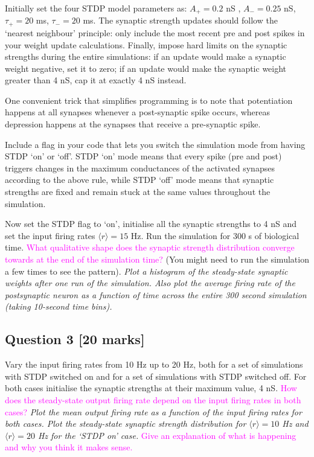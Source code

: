 \documentclass[12pt]{article}
\begin{document}
Initially set the four STDP model parameters as: $A_{+}=0.2$ nS ,
$A_{-}=0.25$ nS, $\tau_{+}=20$ ms, $\tau_{-}=20$ ms. The synaptic
strength updates should follow the `nearest neighbour' principle:
only include the most recent pre and post spikes in your weight update
calculations. Finally, impose hard limits on the synaptic strengths
during the entire simulations: if an update would make a synaptic
weight negative, set it to zero; if an update would make the synaptic
weight greater than 4 nS, cap it at exactly 4 nS instead.

One convenient trick that simplifies programming is to note that potentiation happens at all synapses whenever a post-synaptic spike occurs, whereas depression happens at the synapses that receive a pre-synaptic spike.

Include a flag in your code that lets you switch the simulation mode
from having STDP `on' or `off'. STDP `on' mode means that every
spike (pre and post) triggers changes in the maximum conductances
of the activated synapses according to the above rule, while STDP
`off' mode means that synaptic strengths are fixed and remain stuck
at the same values throughout the simulation.


Now set the STDP flag to `on', initialise all the synaptic strengths to 4 nS and set the input firing rates $\langle r\rangle=15$
Hz. Run the simulation for 300 s of biological time. \textcolor{magenta}{What qualitative shape does the synaptic strength distribution converge towards at the end of the simulation time?} (You might need to run the simulation a few times to see the pattern).
\emph{Plot a histogram of the steady-state synaptic weights after
one run of the simulation. Also plot the average firing rate of the
postsynaptic neuron as a function of time across the entire
300 second simulation (taking 10-second time bins).}

\subsection*{Question 3 [20 marks]} Vary the input firing rates from 10 Hz up to 20 Hz,
both for a set of simulations with STDP switched on and for a set
of simulations with STDP switched off. For both cases initialise the synaptic strengths at their maximum value, 4 nS. \textcolor{magenta}{How does
the steady-state output firing rate depend on the input firing rates
in both cases?} \emph{Plot the mean output firing rate as a function
of the input firing rates for both cases. Plot the steady-state synaptic strength
distribution for $\langle r\rangle=10$ Hz and $\langle r\rangle=20$
Hz for the `STDP on' case.} \textcolor{magenta}{Give an explanation of what is happening and why you think it makes sense.}
\end{document}
